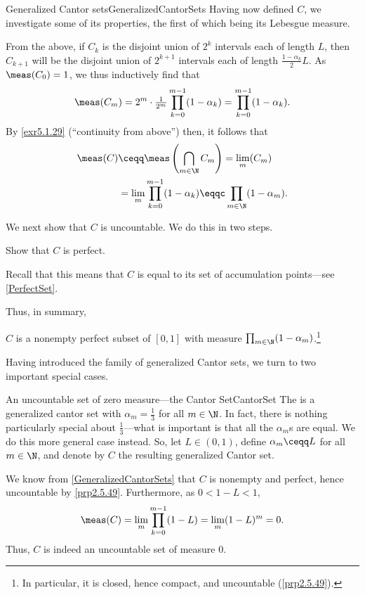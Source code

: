 \begin{exm}{Generalized Cantor sets}{GeneralizedCantorSets}
Having now defined $C$, we investigate some of its properties, the first of which being its Lebesgue measure.

From the above, if $C_k$ is the disjoint union of $2^k$ intervals each of length $L$, then $C_{k+1}$ will be the disjoint union of $2^{k+1}$ intervals each of length $\frac{1-\alpha _k}{2}L$.  As $\meas (C_0)=1$, we thus inductively find that
\begin{equation}
\meas (C_m)=2^m\cdot \tfrac{1}{2^m}\prod _{k=0}^{m-1}(1-\alpha _k)=\prod _{k=0}^{m-1}(1-\alpha _k).
\end{equation}
By \cref{exr5.1.29} (``continuity from above'') then, it follows that
\begin{equation}
\begin{split}
\meas (C) & \ceqq \meas \left( \bigcap _{m\in \N}C_m\right) =\lim _m(C_m) \\
& =\lim _m\prod _{k=0}^{m-1}(1-\alpha _k)\eqqc \prod _{m\in \N}(1-\alpha _m).
\end{split}
\end{equation}

We next show that $C$ is uncountable.  We do this in two steps.
\begin{exr}[breakable=false]{}{}
Show that $C$ is perfect.
\begin{rmk}
Recall that this means that $C$ is equal to its set of accumulation points---see \cref{PerfectSet}.
\end{rmk}
\end{exr}

Thus, in summary,
\begin{important}
$C$ is a nonempty perfect subset of $[0,1]$ with measure $\prod _{m\in \N}(1-\alpha _m)$.\footnote{In particular, it is closed, hence compact, and uncountable (\cref{prp2.5.49}).}
\end{important}
\end{exm}
Having introduced the family of generalized Cantor sets, we turn to two important special cases.
\begin{exm}{An uncountable set of zero measure---the Cantor Set}{CantorSet}
The  is a generalized cantor set with $\alpha _m=\frac{1}{3}$ for all $m\in \N$.  In fact, there is nothing particularly special about $\frac{1}{3}$---what is important is that all the $\alpha _m$s are equal.  We do this more general case instead.  So, let $L\in (0,1)$, define $\alpha _m\ceqq L$ for all $m\in \N$, and denote by $C$ the resulting generalized Cantor set.

We know from \cref{GeneralizedCantorSets} that $C$ is nonempty and perfect, hence uncountable by \cref{prp2.5.49}.  Furthermore, as $0<1-L<1$,
\begin{equation}
\meas (C)=\lim _m\prod _{k=0}^{m-1}(1-L)=\lim _m(1-L)^m=0.
\end{equation} 
Thus, $C$ is indeed an uncountable set of measure $0$.
\end{exm}
